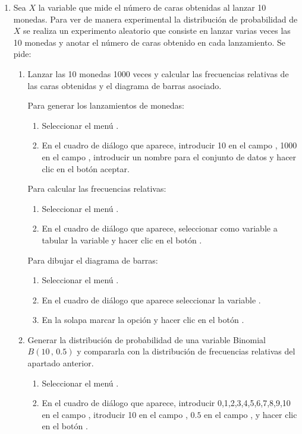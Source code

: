 \begin{enumerate}[leftmargin=*]
\item Sea $X$ la variable que mide el número de caras obtenidas al lanzar 10 monedas. Para ver de manera experimental
la distribución de probabilidad de $X$ se realiza un experimento aleatorio que consiste en lanzar varias veces las 10
monedas y anotar el número de caras obtenido en cada lanzamiento. Se pide:
\begin{enumerate}
\item Lanzar las 10 monedas 1000 veces y calcular las frecuencias relativas de las caras obtenidas y el diagrama de
barras asociado.
\begin{indicacion}{Para generar los lanzamientos de monedas:
\begin{enumerate}
\item Seleccionar el menú .
\item En el cuadro de diálogo que aparece, introducir 10 en el campo , 1000 en el campo
, introducir un nombre para el conjunto de datos y hacer clic en el
botón aceptar.
\end{enumerate}
Para calcular las frecuencias relativas:
\begin{enumerate}
\item Seleccionar el menú .
\item En el cuadro de diálogo que aparece, seleccionar como variable a tabular la variable  y hacer clic
en el botón .
\end{enumerate}
Para dibujar el diagrama de barras:
\begin{enumerate}
\item Seleccionar el menú .
\item En el cuadro de diálogo que aparece seleccionar la variable .
\item En la solapa  marcar la opción  y hacer clic en el
botón .
\end{enumerate}}
\end{indicacion}

\item Generar la distribución de probabilidad de una variable Binomial $B(10\,,\,0.5)$ y compararla con la distribución de frecuencias relativas del apartado anterior.
\begin{indicacion}{
\begin{enumerate}
\item Seleccionar el menú .
\item En el cuadro de diálogo que aparece, introducir 0,1,2,3,4,5,6,7,8,9,10 en el campo ,
itroducir 10 en el campo , $0.5$ en el campo , y hacer clic
en el botón .
\end{enumerate}}
\end{indicacion}


\end{enumerate}
\end{enumerate}
